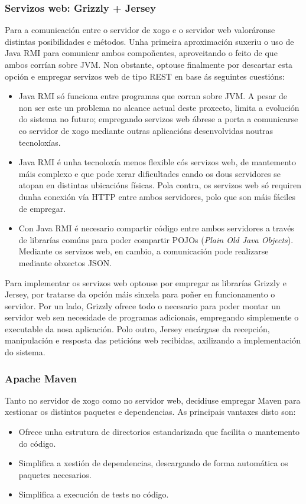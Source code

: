 \subsubsection{Servizos web: Grizzly + Jersey}
Para a comunicación entre o servidor de xogo e o servidor web valoráronse
distintas posibilidades e métodos. Unha primeira aproximación suxeriu o uso de
Java RMI para comunicar ambos compoñentes, aproveitando o feito de que ambos
corrían sobre JVM. Non obstante, optouse finalmente por descartar esta
opción e empregar servizos web de tipo REST en base ás seguintes cuestións:
\begin{itemize}
  \item Java RMI só funciona entre programas que corran sobre JVM. A pesar de
  non ser este un problema no alcance actual deste proxecto, limita a evolución
  do sistema no futuro; empregando servizos web ábrese a porta a comunicarse co
  servidor de xogo mediante outras aplicacións desenvolvidas noutras
  tecnoloxías.
  \item Java RMI é unha tecnoloxía menos flexible cós servizos
  web, de mantemento máis complexo e que pode xerar dificultades cando os dous
  servidores se atopan en distintas ubicacións físicas. Pola contra, os servizos
  web só requiren dunha conexión vía HTTP entre ambos servidores, polo que son
  máis fáciles de empregar.
  \item Con Java RMI é necesario compartir código entre ambos servidores a
  través de librarías comúns para poder compartir POJOs ({\it Plain Old Java
  Objects}). Mediante os servizos web, en cambio, a comunicación pode realizarse
  mediante obxectos JSON.
\end{itemize}
Para implementar os servizos web optouse por empregar as librarías Grizzly e
Jersey, por tratarse da opción máis sinxela para poñer en funcionamento o
servidor. Por un lado, Grizzly ofrece todo o necesario para poder montar un
servidor web sen necesidade de programas adicionais, empregando simplemente o
executable da nosa aplicación. Polo outro, Jersey encárgase da recepción,
manipulación e resposta das peticións web recibidas, axilizando a
implementación do sistema.

\subsubsection{Apache Maven}
Tanto no servidor de xogo como no servidor web, decidiuse empregar Maven para
xestionar os distintos paquetes e dependencias. As principais vantaxes disto
son:
\begin{itemize}
  \item Ofrece unha estrutura de directorios estandarizada que facilita o
  mantemento do código.
  \item Simplifica a xestión de dependencias, descargando de forma automática os
  paquetes necesarios.
  \item Simplifica a execución de tests no código.
\end{itemize}

